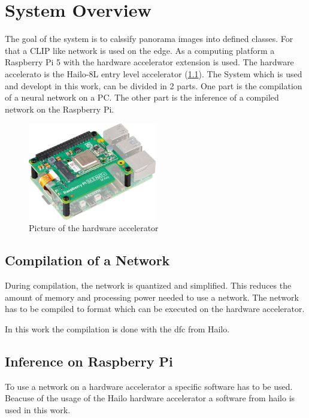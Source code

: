 \chapter{System Overview}

The goal of the system is to calssify panorama images into defined classes.
For that a CLIP like network is used on the edge.
As a computing platform a Raspberry Pi 5 with the hardware accelerator extension is used.
The hardware accelerato is the Hailo-8L entry level accelerator (\cref{fig:overview:aikit}).
The System which is used and developt in this work, can be divided in 2 parts.
One part is the compilation of a neural network on a PC.
The other part is the inference of a compiled network on the Raspberry Pi.

\begin{figure}
    \centering
    \includegraphics[width=0.5\textwidth]{Images/SystemOverview/ai-kit.png}
    \caption{Picture of the hardware accelerator \cite{bildAiKit}}
    \label{fig:overview:aikit}
\end{figure}

\section{Compilation of a Network}

During compilation, the network is quantized and simplified.
This reduces the amount of memory and processing power needed to use a network.
The network has to be compiled to format which can be executed on the hardware accelerator.

In this work the compilation is done with the \Acrlong{dfc} from Hailo.

\section{Inference on Raspberry Pi}

To use a network on a hardware accelerator a specific software has to be used.
Beacuse of the usage of the Hailo hardware accelerator a software from hailo is used in this work.
